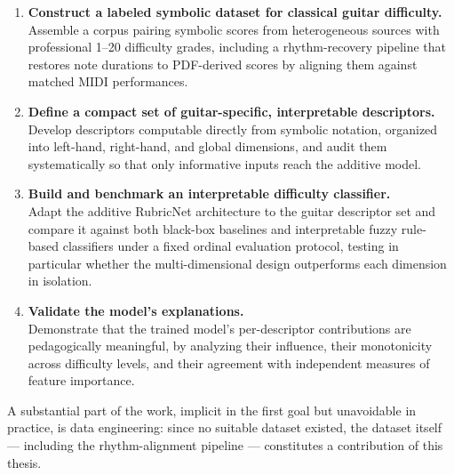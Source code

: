\begin{enumerate}
    \item \textbf{Construct a labeled symbolic dataset for classical guitar difficulty.}\\
    Assemble a corpus pairing symbolic scores from heterogeneous sources with professional 1--20 difficulty grades, including a rhythm-recovery pipeline that restores note durations to PDF-derived scores by aligning them against matched MIDI performances.
    \item \textbf{Define a compact set of guitar-specific, interpretable descriptors.}\\
    Develop descriptors computable directly from symbolic notation, organized into left-hand, right-hand, and global dimensions, and audit them systematically so that only informative inputs reach the additive model.
    \item \textbf{Build and benchmark an interpretable difficulty classifier.}\\
    Adapt the additive RubricNet architecture to the guitar descriptor set and compare it against both black-box baselines and interpretable fuzzy rule-based classifiers under a fixed ordinal evaluation protocol, testing in particular whether the multi-dimensional design outperforms each dimension in isolation.
    \item \textbf{Validate the model's explanations.}\\
    Demonstrate that the trained model's per-descriptor contributions are pedagogically meaningful, by analyzing their influence, their monotonicity across difficulty levels, and their agreement with independent measures of feature importance.
\end{enumerate}

A substantial part of the work, implicit in the first goal but unavoidable in practice, is data engineering: since no suitable dataset existed, the dataset itself --- including the rhythm-alignment pipeline --- constitutes a contribution of this thesis.

